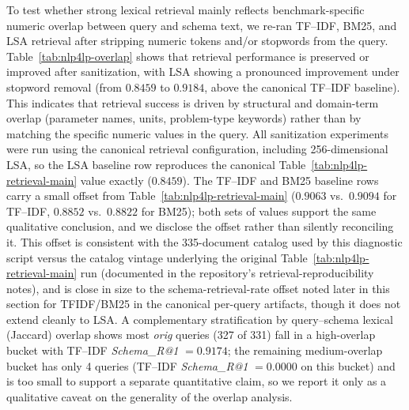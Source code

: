 \documentclass[pdflatex,sn-basic,Numbered]{sn-jnl}
\begin{document}
To test whether strong lexical retrieval mainly reflects benchmark-specific numeric overlap between query and schema text, we re-ran TF--IDF, BM25, and LSA retrieval after stripping numeric tokens and/or stopwords from the query. Table~\ref{tab:nlp4lp-overlap} shows that retrieval performance is preserved or improved after sanitization, with LSA showing a pronounced improvement under stopword removal (from $0.8459$ to $0.9184$, above the canonical TF--IDF baseline). This indicates that retrieval success is driven by structural and domain-term overlap (parameter names, units, problem-type keywords) rather than by matching the specific numeric values in the query. All sanitization experiments were run using the canonical retrieval configuration, including 256-dimensional LSA, so the LSA baseline row reproduces the canonical Table~\ref{tab:nlp4lp-retrieval-main} value exactly ($0.8459$). The TF--IDF and BM25 baseline rows carry a small offset from Table~\ref{tab:nlp4lp-retrieval-main} ($0.9063$ vs.\ $0.9094$ for TF--IDF, $0.8852$ vs.\ $0.8822$ for BM25); both sets of values support the same qualitative conclusion, and we disclose the offset rather than silently reconciling it. This offset is consistent with the 335-document catalog used by this diagnostic script versus the catalog vintage underlying the original Table~\ref{tab:nlp4lp-retrieval-main} run (documented in the repository's retrieval-reproducibility notes), and is close in size to the schema-retrieval-rate offset noted later in this section for TFIDF/BM25 in the canonical per-query artifacts, though it does not extend cleanly to LSA. A complementary stratification by query--schema lexical (Jaccard) overlap shows most \emph{orig} queries (327 of 331) fall in a high-overlap bucket with TF--IDF \textit{Schema\_R@1} $=0.9174$; the remaining medium-overlap bucket has only 4 queries (TF--IDF \textit{Schema\_R@1} $=0.0000$ on this bucket) and is too small to support a separate quantitative claim, so we report it only as a qualitative caveat on the generality of the overlap analysis.
\end{document}
